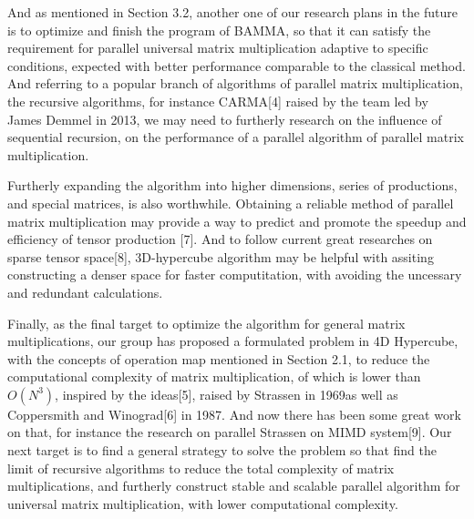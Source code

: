 \documentclass{amsart}
\theoremstyle{definition}
\theoremstyle{remark}
\numberwithin{equation}{section}
\begin{document}
	And as mentioned in Section 3.2, another one of our research plans in the future is to optimize and finish the program of BAMMA, so that it can satisfy the requirement for parallel universal matrix multiplication adaptive to specific conditions, expected with better performance comparable to the classical method. And referring to a popular branch of algorithms of parallel matrix multiplication, the recursive algorithms, for instance CARMA[4] raised by the team led by James Demmel in 2013, we may need to furtherly research on the influence of sequential recursion, on the performance of a parallel algorithm of parallel matrix multiplication.

	Furtherly expanding the algorithm into higher dimensions, series of productions, and special matrices, is also worthwhile. Obtaining a reliable method of parallel matrix multiplication may provide a way to predict and promote the speedup and efficiency of tensor production [7]. And to follow current great researches on sparse tensor space[8], 3D-hypercube algorithm may be helpful with assiting constructing a denser space for faster computitation, with avoiding the uncessary and redundant calculations.  
	
	Finally, as the final target to optimize the algorithm for general matrix multiplications, our group has proposed a formulated problem in 4D Hypercube, with the concepts of operation map mentioned in Section 2.1, to reduce the computational complexity of matrix multiplication, of which is lower than $O(N^3)$, inspired by the ideas[5],  raised by Strassen in 1969as well as Coppersmith and Winograd[6] in 1987. And now there has been some great work on that, for instance the research on parallel Strassen on MIMD system[9]. Our next target is to find a general strategy to solve the problem so that find the limit of recursive algorithms to reduce the total complexity of matrix multiplications, and furtherly construct stable and scalable parallel algorithm for universal matrix multiplication, with lower computational complexity.
\end{document}
